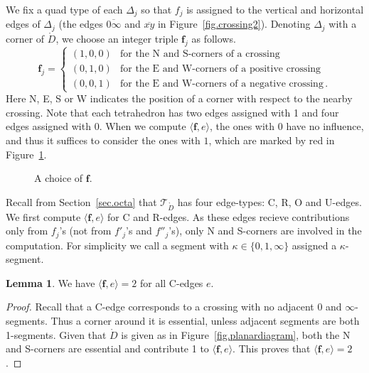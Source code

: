 \documentclass[12pt,reqno]{amsart}
\theoremstyle{definition}
\newtheorem{lemma}[theorem]{Lemma}
\def\calT{\mathcal T}
\renewcommand{\Ddot}{\mathring{D}}
\begin{document}
We fix a quad type of each $\Delta_j$ so that $f_j$ is assigned to the vertical
and horizontal edges of $\Delta_j$ (the edges $\overline{0\infty}$ and
$\overline{xy}$ in Figure~\ref{fig.crossing2}).
Denoting $\Delta_j$ with a corner of $\Ddot$, we choose an integer triple
${\boldsymbol f}_j$ as follows.
\begin{equation}
\label{eqn.fl1}
{\boldsymbol f}_j  =
\begin{cases}
(1,0,0) & \textrm{for the N and S-corners of a crossing} \\
(0,1,0) & \textrm{for the E and W-corners of a positive crossing} \\
(0,0,1) & \textrm{for the E and W-corners of a negative crossing} \, .
\end{cases}
\end{equation}
Here N, E, S or W indicates the position of a corner with respect to the nearby
crossing. Note that each tetrahedron has two edges assigned with 1 and four edges
assigned with 0. When we compute  $\langle {\boldsymbol f}, e \rangle$, the ones
with 0 have no influence, and thus it suffices to consider the ones with $1$, which
are marked by red in Figure~\ref{fig.octahedronatd}.

\begin{figure}[htpb!]

\caption{A choice of ${\boldsymbol f}$.}
\label{fig.octahedronatd}
\end{figure}

Recall from Section~\ref{sec.octa} that $\calT_{\Ddot}$ has four edge-types: C, R, O
and U-edges. We first compute $\langle {\boldsymbol f}, e \rangle$ for C and R-edges.  
As these edges recieve contributions only from $f_j$'s (not from $f'_j$'s and
$f''_j$'s),  only N and S-corners are involved in the computation.
For simplicity we call a segment with $\kappa \in \{ 0,1,\infty\}$ assigned a
$\kappa$-segment.

\begin{lemma} 
\label{lem.C}
We have $\langle {\boldsymbol f}, e \rangle=2$ for all C-edges $e$.
\end{lemma}

\begin{proof}
Recall that a C-edge corresponds to a crossing with no adjacent $0$ and
$\infty$-segments. Thus a corner around it is essential, unless adjacent segments
are both 1-segments. Given that $\Ddot$ is given as in Figure~\ref{fig.planardiagram},
both the N and S-corners are essential and contribute 1 to
$\langle {\boldsymbol f}, e \rangle$. This proves that
$\langle {\boldsymbol f}, e \rangle=2$. 
\end{proof}
\end{document}
